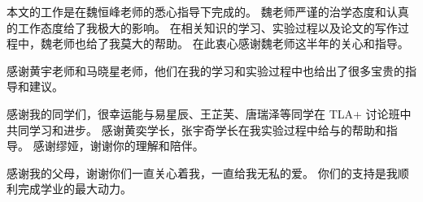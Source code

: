 \begin{acknowledgement}
  本文的工作是在魏恒峰老师的悉心指导下完成的。
  魏老师严谨的治学态度和认真的工作态度给了我极大的影响。
  在相关知识的学习、实验过程以及论文的写作过程中，魏老师也给了我莫大的帮助。
  在此衷心感谢魏老师这半年的关心和指导。

感谢黄宇老师和马晓星老师，他们在我的学习和实验过程中也给出了很多宝贵的指导和建议。

感谢我的同学们，很幸运能与易星辰、王芷芙、唐瑞泽等同学在 TLA+ 讨论班中共同学习和进步。
感谢黄奕学长，张宇奇学长在我实验过程中给与的帮助和指导。
感谢缪娅，谢谢你的理解和陪伴。

感谢我的父母，谢谢你们一直关心着我，一直给我无私的爱。
你们的支持是我顺利完成学业的最大动力。
\end{acknowledgement}